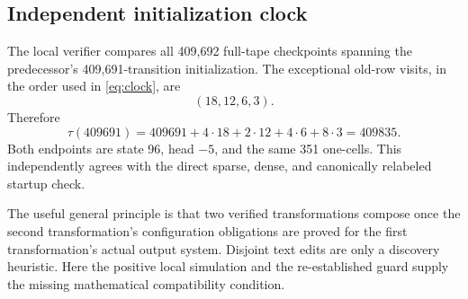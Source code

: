 \subsection{Independent initialization clock}

The local verifier compares all 409,692 full-tape checkpoints
spanning the predecessor's 409,691-transition initialization.
The exceptional old-row visits, in the order used in
\eqref{eq:clock}, are
\[
 (18,12,6,3).
\]
Therefore
\[
 \tau(409691)
 =409691+4\cdot18+2\cdot12+4\cdot6+8\cdot3
 =409835.
\]
Both endpoints are state 96, head $-5$, and the same 351 one-cells.
This independently agrees with the direct sparse, dense, and
canonically relabeled startup check.

The useful general principle is that two verified transformations
compose once the second transformation's configuration obligations
are proved for the first transformation's actual output system.
Disjoint text edits are only a discovery heuristic. Here the
positive local simulation and the re-established guard supply the
missing mathematical compatibility condition.
